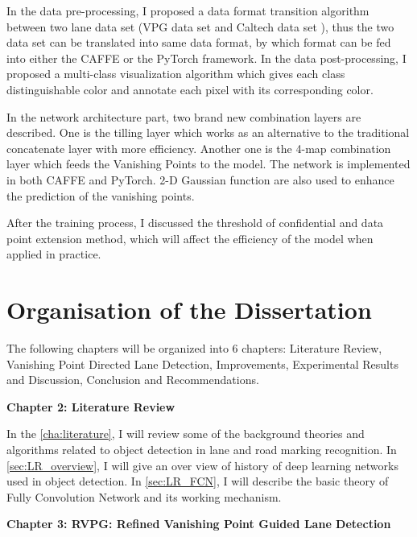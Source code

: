 \begin{spacing}{1.5}
In the data pre-processing, I proposed a data format transition algorithm between two lane data set (VPG data set \cite{lee2017vpgnet} and Caltech data set \cite{aly2008real}), thus the two data set can be translated into same data format, by which format can be fed into either the CAFFE or the PyTorch framework. In the data post-processing, I proposed a multi-class visualization algorithm which gives each class distinguishable color and annotate each pixel with its corresponding color.

In the network architecture part, two brand new combination layers are described. One is the tilling layer which works as an alternative to the traditional concatenate layer with more efficiency. Another one is the 4-map combination layer which feeds the Vanishing Points to the model. The network is implemented in both CAFFE and PyTorch. 2-D Gaussian function are also used to enhance the prediction of the vanishing points.

After the training process, I discussed the threshold of confidential and data point extension method, which will affect the efficiency of the model when applied in practice.

\section{Organisation of the Dissertation}
\label{sec:IN_organisation}

The following chapters will be organized into 6 chapters: Literature Review, Vanishing Point Directed Lane Detection, Improvements, Experimental Results and Discussion, Conclusion and Recommendations.

{\large\textbf{Chapter 2: Literature Review}}

In the \autoref{cha:literature}, I will review some of the background theories and algorithms related to object detection in lane and road marking recognition. In \autoref{sec:LR_overview}, I will give an over view of history of deep learning networks used in object detection. In \autoref{sec:LR_FCN}, I will describe the basic theory of Fully Convolution Network and its working mechanism. 

{\large\textbf{Chapter 3: RVPG: Refined Vanishing Point Guided Lane Detection}}


\end{spacing}
